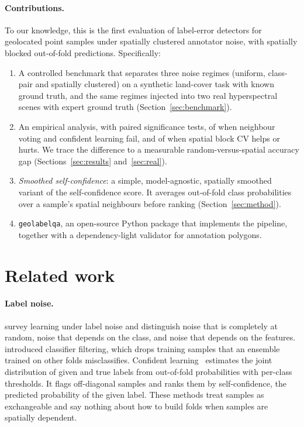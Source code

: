 \documentclass[11pt]{article}
\begin{document}
\paragraph{Contributions.}
To our knowledge, this is the first evaluation of label-error detectors for
geolocated point samples under spatially clustered annotator noise, with
spatially blocked out-of-fold predictions. Specifically:
\begin{enumerate}
\item A controlled benchmark that separates three noise regimes (uniform,
  class-pair and spatially clustered) on a synthetic land-cover task with known
  ground truth, and the same regimes injected into two real hyperspectral scenes
  with expert ground truth (Section~\ref{sec:benchmark}).
\item An empirical analysis, with paired significance tests, of when neighbour
  voting and confident learning fail, and of when spatial block CV helps or
  hurts. We trace the difference to a measurable random-versus-spatial accuracy
  gap (Sections~\ref{sec:results} and~\ref{sec:real}).
\item \emph{Smoothed self-confidence}: a simple, model-agnostic, spatially
  smoothed variant of the self-confidence score. It averages out-of-fold class
  probabilities over a sample's spatial neighbours before ranking
  (Section~\ref{sec:method}).
\item \texttt{geolabelqa}, an open-source Python package that implements the
  pipeline, together with a dependency-light validator for annotation polygons.
\end{enumerate}

\section{Related work}

\paragraph{Label noise.}
\citet{frenay2014survey} survey learning under label noise and distinguish
noise that is completely at random, noise that depends on the class, and noise
that depends on the features. \citet{brodley1999identifying} introduced
classifier filtering, which drops training samples that an ensemble trained on
other folds misclassifies. Confident learning~\citep{northcutt2021confident}
estimates the joint distribution of given and true labels from out-of-fold
probabilities with per-class thresholds. It flags off-diagonal samples and ranks
them by self-confidence, the predicted probability of the given label. These
methods treat samples as exchangeable and say nothing about how to build folds
when samples are spatially dependent.
\end{document}
